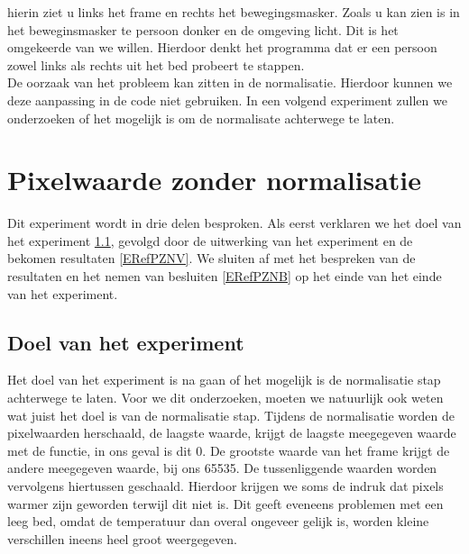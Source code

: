  hierin ziet u links het frame en rechts het bewegingsmasker. Zoals u kan zien is in het beweginsmasker te persoon donker en de omgeving licht. Dit is het omgekeerde van we willen. Hierdoor denkt het programma dat er een persoon zowel links als rechts uit het bed probeert te stappen.\\
 De oorzaak van het probleem kan zitten in de normalisatie. Hierdoor kunnen we deze aanpassing in de code niet gebruiken. In een volgend experiment zullen we onderzoeken of het mogelijk is om de normalisate achterwege te laten. 
 
 \section{Pixelwaarde zonder normalisatie}
 \label{ERefPZN}
 Dit experiment wordt in drie delen besproken. Als eerst verklaren we het doel van het experiment \ref{ERefPZND}, gevolgd door de uitwerking van het experiment en de bekomen resultaten \ref{ERefPZNV}. We sluiten af met het bespreken van de resultaten en het nemen van besluiten \ref{ERefPZNB} op het einde van het einde van het experiment.
 
 \subsection{Doel van het experiment}
 \label{ERefPZND}
 Het doel van het experiment is na gaan of het mogelijk is de normalisatie stap achterwege te laten. Voor we dit onderzoeken, moeten we natuurlijk ook weten wat juist het doel is van de normalisatie stap. Tijdens de normalisatie worden de pixelwaarden herschaald, de laagste waarde, krijgt de laagste meegegeven waarde met de functie, in ons geval is dit 0. De grootste waarde van het frame krijgt de andere meegegeven waarde, bij ons 65535. De tussenliggende waarden worden vervolgens hiertussen geschaald. Hierdoor krijgen we soms de indruk dat pixels warmer zijn geworden terwijl dit niet is. Dit geeft eveneens problemen met een leeg bed, omdat de temperatuur dan overal ongeveer gelijk is, worden kleine verschillen ineens heel groot weergegeven. 
 
